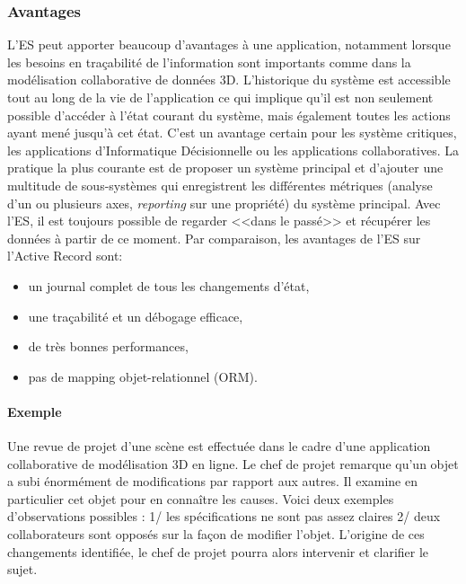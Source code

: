 \subsubsection{Avantages}
L'\gls{ES} peut apporter beaucoup d'avantages à une application, notamment 
lorsque les besoins en traçabilité de l'information sont importants comme dans 
la modélisation collaborative de données 3D.
L'historique du système est accessible tout au long de la vie de l'application ce 
qui implique qu'il est non seulement possible d'accéder à l'état courant du 
système, mais également toutes les actions ayant mené jusqu'à cet état. C'est 
un avantage certain pour les système critiques, les applications d'Informatique 
Décisionnelle ou les applications collaboratives. La pratique la plus 
courante est de proposer un système principal et d'ajouter une multitude de 
sous-systèmes qui enregistrent les différentes métriques (analyse d'un ou 
plusieurs axes, \textit{reporting} sur une propriété) du système principal. Avec 
l'\gls{ES}, il est toujours possible de regarder <<dans le passé>> et récupérer 
les données à partir de ce moment. Par comparaison, les avantages de 
l'\gls{ES} sur l'Active Record sont:
\begin{itemize}
	\item un journal complet de tous les changements d'état,
	\item une traçabilité et un débogage efficace,
	\item de très bonnes performances,
	\item pas de mapping objet-relationnel (ORM).
\end{itemize}

	
\paragraph{Exemple} 
Une revue de projet d'une scène est effectuée dans le cadre d'une application 
collaborative de modélisation 3D en ligne. Le chef de projet remarque qu'un 
objet a subi énormément de modifications par rapport aux autres. Il examine en 
particulier cet objet pour en connaître les causes. Voici deux exemples 
d'observations possibles : 1/ les spécifications ne sont pas assez claires 2/ 
deux collaborateurs sont opposés sur la façon de modifier l'objet. L'origine de 
ces changements identifiée, le chef de projet pourra alors intervenir et clarifier 
le sujet. 

